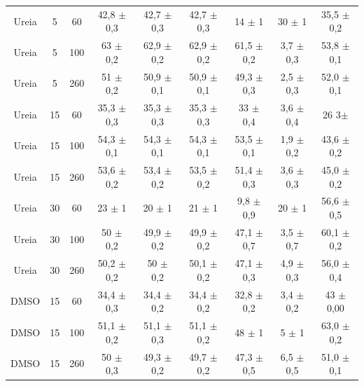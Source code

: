 \begin{table}[h]
\begin{adjustbox}{angle=90}
{\begin{tabular}{c c c | c c c c c c}
		Ureia   & 5          & 60         & 42,8    \(\pm\) 0,3 & 42,7     \(\pm\) 0,3 & 42,7     \(\pm\) 0,3 & 14          \(\pm\) 1   & 30          \(\pm\) 1   & 35,5  \(\pm\)  0,2 \\
		Ureia   & 5          & 100        & 63      \(\pm\) 0,2 & 62,9     \(\pm\) 0,2 & 62,9     \(\pm\) 0,2 & 61,5        \(\pm\) 0,2 & 3,7         \(\pm\) 0,3 & 53,8  \(\pm\)  0,1 \\
		Ureia   & 5          & 260        & 51      \(\pm\) 0,2 & 50,9     \(\pm\) 0,1 & 50,9     \(\pm\) 0,1 & 49,3        \(\pm\) 0,3 & 2,5         \(\pm\) 0,3 & 52,0  \(\pm\)  0,1 \\ 
		Ureia   & 15         & 60         & 35,3    \(\pm\) 0,3 & 35,3     \(\pm\) 0,3 & 35,3     \(\pm\) 0,3 & 33          \(\pm\) 0,4 & 3,6         \(\pm\) 0,4 & 26  3\(\pm\) \\
		Ureia   & 15         & 100        & 54,3    \(\pm\) 0,1 & 54,3     \(\pm\) 0,1 & 54,3     \(\pm\) 0,1 & 53,5        \(\pm\) 0,1 & 1,9         \(\pm\) 0,2 & 43,6  \(\pm\)  0,2 \\
		Ureia   & 15         & 260        & 53,6    \(\pm\) 0,2 & 53,4     \(\pm\) 0,2 & 53,5     \(\pm\) 0,2 & 51,4        \(\pm\) 0,3 & 3,6         \(\pm\) 0,3 & 45,0  \(\pm\)  0,2 \\ 
		Ureia   & 30         & 60         & 23      \(\pm\) 1   & 20       \(\pm\) 1   & 21       \(\pm\) 1   & 9,8         \(\pm\) 0,9 & 20          \(\pm\) 1   & 56,6  \(\pm\)  0,5 \\
		Ureia   & 30         & 100        & 50      \(\pm\) 0,2 & 49,9     \(\pm\) 0,2 & 49,9     \(\pm\) 0,2 & 47,1        \(\pm\) 0,7 & 3,5         \(\pm\) 0,7 & 60,1  \(\pm\)  0,2 \\
		Ureia   & 30         & 260        & 50,2    \(\pm\) 0,2 & 50       \(\pm\) 0,2 & 50,1     \(\pm\) 0,2 & 47,1        \(\pm\) 0,3 & 4,9         \(\pm\) 0,3 & 56,0  \(\pm\)  0,4 \\  \midrule
		DMSO    & 15         & 60         & 34,4    \(\pm\) 0,3 & 34,4     \(\pm\) 0,2 & 34,4     \(\pm\) 0,2 & 32,8        \(\pm\) 0,2 & 3,4         \(\pm\) 0,2 & 43    \(\pm\)  0,00 \\
		DMSO    & 15         & 100        & 51,1    \(\pm\) 0,2 & 51,1     \(\pm\) 0,3 & 51,1     \(\pm\) 0,2 & 48          \(\pm\) 1   & 5           \(\pm\) 1   & 63,0  \(\pm\)  0,2 \\
		DMSO    & 15         & 260        & 50      \(\pm\) 0,3 & 49,3     \(\pm\) 0,2 & 49,7     \(\pm\) 0,2 & 47,3        \(\pm\) 0,5 & 6,5         \(\pm\) 0,5 & 51,0  \(\pm\)  0,1 \\ 

\end{tabular}}
\end{adjustbox}
\end{table}
